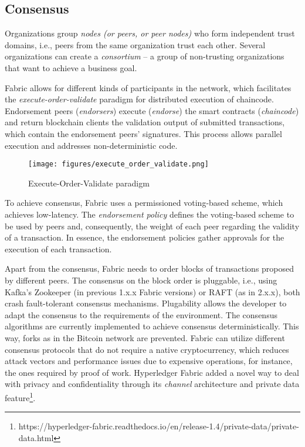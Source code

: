 \documentclass[12pt,a4paper]{article}
\theoremstyle{definition}
\begin{document}
\subsection{Consensus}

Organizations group \emph{nodes (or peers, or peer nodes)} who form independent trust domains, i.e., peers from the same organization trust each other. Several organizations can create a \textit{consortium} -- a group of non-trusting organizations that want to achieve a business goal.

Fabric allows for different kinds of participants in the network, which facilitates the \emph{execute-order-validate} paradigm for distributed execution of chaincode. Endorsement peers (\emph{endorsers}) execute (\emph{endorse}) the smart contracts (\emph{chaincode}) and return blockchain clients the validation output of submitted transactions,  which contain the endorsement peers' signatures. This process allows parallel execution and addresses non-deterministic code.

\begin{figure}[h]

\texttt{[image: figures/execute\_order\_validate.png]}
\centering
\caption{Execute-Order-Validate paradigm \cite{execute_order_validate}}
\label{fig:hf}
\end{figure}

To achieve consensus, Fabric uses a permissioned voting-based scheme, which achieves low-latency. The \emph{endorsement policy} defines the voting-based scheme to be used by peers and, consequently, the weight of each peer regarding the validity of a transaction. In essence, the endorsement policies gather approvals for the execution of each transaction.

Apart from the consensus, Fabric needs to order blocks of transactions proposed by different peers. The consensus on the block order is pluggable, i.e., using Kafka's Zookeeper (in previous 1.x.x Fabric versions) or RAFT (as in 2.x.x), both crash fault-tolerant consensus mechanisms. Plugability allows the developer to adapt the consensus to the requirements of the environment. The consensus algorithms are currently implemented to achieve consensus deterministically. This way, forks as in the Bitcoin network are prevented. Fabric can utilize different consensus protocols that do not require a native cryptocurrency, which reduces attack vectors and performance issues due to expensive operations, for instance, the ones required by proof of work.
Hyperledger Fabric added a novel way to deal with privacy and confidentiality through its \textit{channel} architecture and private data feature\footnote{https://hyperledger-fabric.readthedocs.io/en/release-1.4/private-data/private-data.html}.
\end{document}
